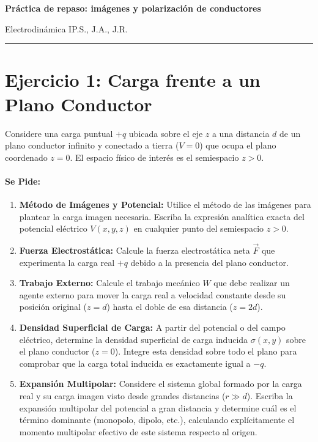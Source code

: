 \documentclass[11pt]{article}
\newcommand{\encabezado}[3]{%
  {\Large\bfseries #1\par}
  \vspace{2pt}
  {\normalsize #2\hfill #3\par}
  \vspace{6pt}\hrule\vspace{8pt}}
\begin{document}
\encabezado{Práctica de repaso: imágenes y polarización de conductores}
{Electrodinámica I}{P.S., J.A., J.R.}

\section*{Ejercicio 1: Carga frente a un Plano Conductor}

Considere una carga puntual $+q$ ubicada sobre el eje $z$ a una distancia $d$ de un plano conductor infinito y conectado a tierra ($V=0$) que ocupa el plano coordenado $z = 0$. El espacio físico de interés es el semiespacio $z > 0$.

\paragraph{Se Pide:}
\begin{enumerate}
    \item \textbf{Método de Imágenes y Potencial:} Utilice el método de las imágenes para plantear la carga imagen necesaria. Escriba la expresión analítica exacta del potencial eléctrico $V(x, y, z)$ en cualquier punto del semiespacio $z > 0$.
    \item \textbf{Fuerza Electrostática:} Calcule la fuerza electrostática neta $\vec{F}$ que experimenta la carga real $+q$ debido a la presencia del plano conductor.
    \item \textbf{Trabajo Externo:} Calcule el trabajo mecánico $W$ que debe realizar un agente externo para mover la carga real a velocidad constante desde su posición original ($z = d$) hasta el doble de esa distancia ($z = 2d$).
    \item \textbf{Densidad Superficial de Carga:} A partir del potencial o del campo eléctrico, determine la densidad superficial de carga inducida $\sigma(x, y)$ sobre el plano conductor ($z=0$). Integre esta densidad sobre todo el plano para comprobar que la carga total inducida es exactamente igual a $-q$.
    \item \textbf{Expansión Multipolar:} Considere el sistema global formado por la carga real y su carga imagen visto desde grandes distancias ($r \gg d$). Escriba la expansión multipolar del potencial a gran distancia y determine cuál es el término dominante (monopolo, dipolo, etc.), calculando explícitamente el momento multipolar efectivo de este sistema respecto al origen.
\end{enumerate}
\end{document}
